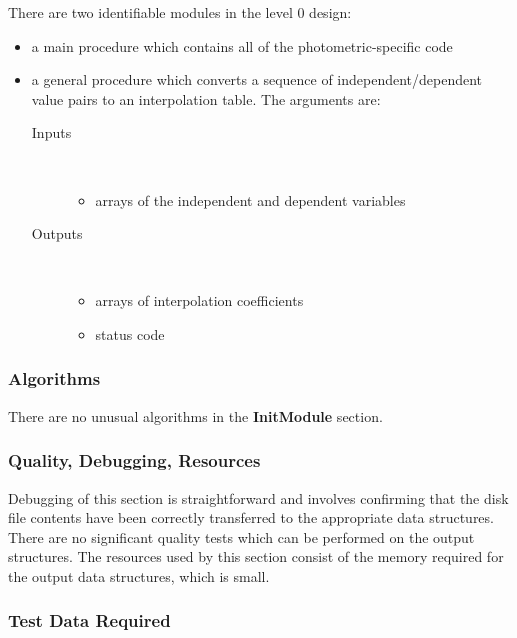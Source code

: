 There are two identifiable modules in the level 0 design:
\begin{itemize}
  \item a main procedure which contains all of the photometric-specific code
  \item a general procedure which converts a sequence of independent/dependent
  value pairs to an interpolation table. The arguments are:
  \begin{description}
    \item[Inputs] \
    \begin{itemize}
      \item arrays of the independent and dependent variables
    \end{itemize}
    \item[Outputs] \
    \begin{itemize}                                                                                            
      \item arrays of interpolation coefficients 
      \item status code
    \end{itemize}
  \end{description}
\end{itemize}
\subsubsection{Algorithms}

There are no unusual algorithms in the {\bf InitModule } section.
\subsubsection{Quality, Debugging, Resources}

Debugging of this section is straightforward and involves confirming that the
disk file contents have been correctly transferred to the appropriate data
structures.
There are no significant quality tests which can be performed on the output
structures.
The resources used by this section consist of the memory required for the
output data structures, which is small.

\subsubsection{Test Data Required}

